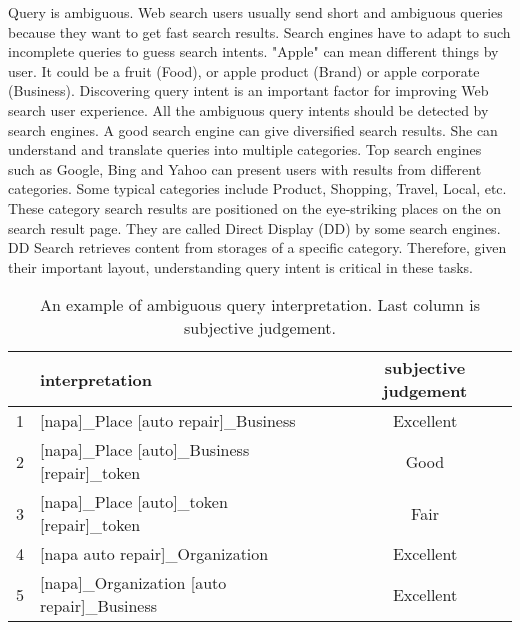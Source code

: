 \documentclass[11pt]{article}
\begin{document}
Query is ambiguous. Web search users usually send short and ambiguous queries because they want to get fast search results. Search engines have to adapt to such incomplete queries to guess search intents. "Apple" can mean different things by user. It could be a fruit (Food), or apple product (Brand) or apple corporate (Business). Discovering query intent is an important factor for improving Web search user experience. All the ambiguous query intents should be detected by search engines.  A good search engine can give diversified search results. She can understand and translate  queries into multiple categories. Top search engines such as Google, Bing and Yahoo can present users with results from different categories. Some typical categories include Product, Shopping, Travel, Local, etc.  These category search results are positioned on the eye-striking places  on the  on search result page. They are called Direct Display (DD) by some search engines.   DD Search retrieves content from storages of a specific category. Therefore, given their important layout, understanding query intent is critical in these tasks. 

\begin{table*}
\begin{center}
\begin{tabular}{|c|l|c|} \hline
 & interpretation & subjective judgement \\ \hline
1 & [napa]\_Place  [auto repair]\_Business & Excellent \\ \hline
2 & [napa]\_Place  [auto]\_Business    [repair]\_token & Good \\ \hline 
3 & [napa]\_Place  [auto]\_token  [repair]\_token & Fair \\ \hline
4 & [napa auto repair]\_Organization & Excellent \\ \hline
5 & [napa]\_Organization  [auto repair]\_Business &  Excellent \\ \hline
\end{tabular}
\caption{An example of ambiguous query interpretation. Last column is subjective judgement.}
\end{center}
\label{table:diversity}
\end{table*}
\end{document}
